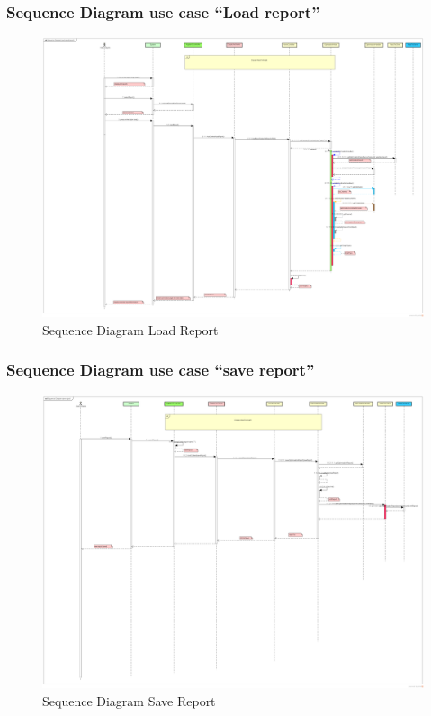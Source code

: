 	\subsubsection{Sequence Diagram use case ``Load report''}
	\begin{figure}[h]
		\centering
		\includegraphics[width=1\textwidth]{SequenceDiagramLoadReport.png}
		\caption{Sequence Diagram Load Report}
	\end{figure}
	\clearpage
	\newpage
	\subsubsection{Sequence Diagram use case ``save report''}
	\begin{figure}[h]
		\centering
		\includegraphics[width=1\textwidth]{SequenceDiagramSaveReport.png}
		\caption{Sequence Diagram Save Report}
	\end{figure}
	\clearpage
	\newpage 
